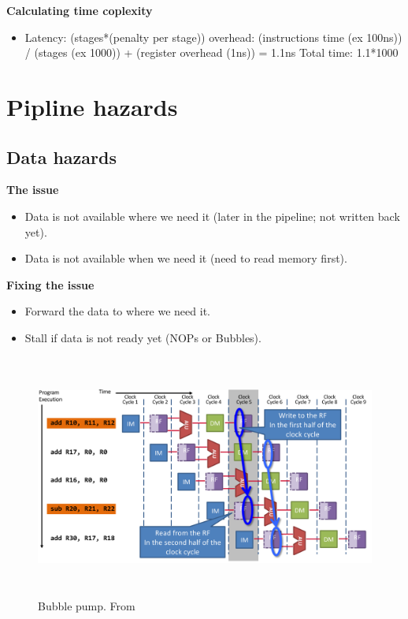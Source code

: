 \textbf{Calculating time coplexity}
\begin{itemize}
\item  Latency: (stages*(penalty per stage)) \newline
  overhead: (instructions time (ex 100ns)) / (stages (ex 1000)) + (register overhead (1ns)) = 1.1ns
  Total time: 1.1*1000
\end{itemize}


\newpage


\section{Pipline hazards}

\subsection{Data hazards}
\textbf{The issue}
\begin{itemize}
\item  Data is not available where we need it (later in the pipeline; not written back yet).
\item  Data is not available when we need it (need to read memory first).
\end{itemize}

\noindent\textbf{Fixing the issue}
\begin{itemize}
\item  Forward the data to where we need it.
\item  Stall if data is not ready yet (NOPs or Bubbles).
\end{itemize}

\begin{figure}[h]
    \vspace{10mm}
    \centering
    \includegraphics[width=16cm, height=8cm]{image/dubble-pump.png} 
    \caption{Bubble pump. From \cite{}}
\end{figure}


